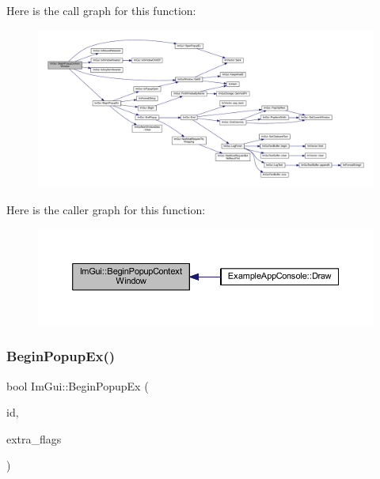 Here is the call graph for this function\+:
\nopagebreak
\begin{figure}[H]
\begin{center}
\leavevmode
\includegraphics[width=350pt]{namespace_im_gui_acf98c99f041ea341d0328e071c56411b_cgraph}
\end{center}
\end{figure}
Here is the caller graph for this function\+:
\nopagebreak
\begin{figure}[H]
\begin{center}
\leavevmode
\includegraphics[width=350pt]{namespace_im_gui_acf98c99f041ea341d0328e071c56411b_icgraph}
\end{center}
\end{figure}
\mbox{\label{namespace_im_gui_a89da3a22300e8293257b6cfdf1b83b7a}} 
\subsubsection{\texorpdfstring{Begin\+Popup\+Ex()}{BeginPopupEx()}}
{\footnotesize\ttfamily bool Im\+Gui\+::\+Begin\+Popup\+Ex (\begin{DoxyParamCaption}\item[{\mbox{\hyperlink{imgui_8h_a1785c9b6f4e16406764a85f32582236f}{Im\+Gui\+ID}}}]{id,  }\item[{\mbox{\hyperlink{imgui_8h_a0b8e067ab4f7a818828c8d89e531addc}{Im\+Gui\+Window\+Flags}}}]{extra\+\_\+flags }\end{DoxyParamCaption})}

